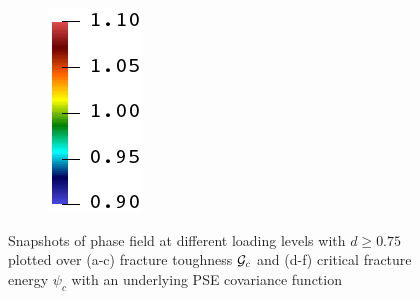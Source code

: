 \begin{figure}[!htbp]
\begin{subfigure}[b]{0.08\textwidth}
    \includegraphics[width=\textwidth]{Chapter4/figures/rainbow_vertical.png}
    \vspace{0.15in}
  \end{subfigure}
  \caption{Snapshots of phase field at different loading levels with $d \geqslant 0.75$ plotted over (a-c) fracture toughness ${\mathcal{G}_c}$ and (d-f) critical fracture energy $\psi_c$ with an underlying PSE covariance function }
  \label{fig: Chapter4/2D/compare_sensitivity_sqexp}
\end{figure}

